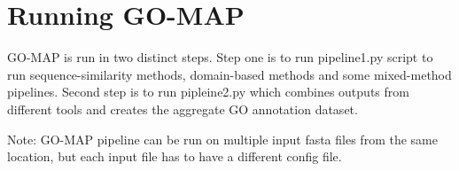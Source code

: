 \section{Running GO-MAP}

GO-MAP is run in two distinct steps. Step one is to run pipeline1.py script to run sequence-similarity methods, domain-based methods and some mixed-method pipelines. Second step is to run pipleine2.py which combines outputs from different tools and creates the aggregate GO annotation dataset.

\begin{em}
Note: GO-MAP pipeline can be run on multiple input fasta files from the same location, but each input file has to have a different config file. 
\end{em}


